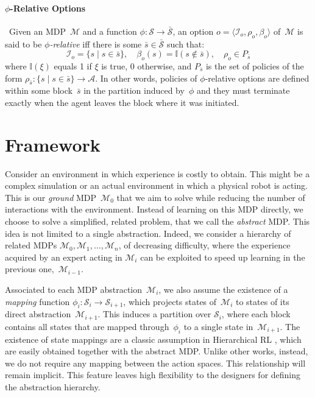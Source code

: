 \documentclass[letterpaper]{article} %
\theoremstyle{plain}
\theoremstyle{definition}
\theoremstyle{remark}
\newcommand{\Indicator}{\mathbb{I}}
\newcommand{\SetSym}[1]{\mathcal{#1}}
\newcommand{\Policy}{\rho}
\newcommand{\PolicySpace}{P}  %
\newcommand{\States}{\SetSym{S}}
\newcommand{\Actions}{\SetSym{A}}
\newcommand{\Model}{\SetSym{M}}
\newcommand{\Mapping}{\phi}
\newcommand{\Abst}[1]{\bar{#1}}
\begin{document}
\paragraph{$\Mapping$-Relative Options}
\cite{abel_2020_ValuePreserving}\, Given an MDP~$\Model$ and a function $\Mapping:
\States \to \Abst\States$, an option $o = \langle \SetSym{I}_o, \Policy_o, \beta_o
\rangle$ of~$\Model$ is said to be \emph{$\Mapping$-relative} iff there is
some $\Abst{s} \in \Abst{\States}$ such that:
\begin{equation}
	\SetSym{I}_o = \{s \mid s \in \Abst{s}\},\quad
	\beta_o(s) = \Indicator(s \not\in \Abst{s}),\quad
	\Policy_o \in \PolicySpace_{\Abst{s}}
\end{equation}
where $\Indicator(\xi)$ equals 1 if $\xi$ is true, $0$ otherwise, and
$\PolicySpace_{\Abst{s}}$ is the set of policies of the form
$\Policy_{\Abst{s}}: \{ s \mid s \in \Abst{s} \} \to \Actions$.
In other words, policies of $\Mapping$-relative options are defined within some block~$\Abst{s}$ in the partition induced by~$\Mapping$
and they must terminate exactly when the agent leaves the block where it was initiated.


\section{Framework}

Consider an environment in which experience is costly to obtain.
This might be a complex simulation or an actual environment in which a physical robot is acting.
This is our \emph{ground} MDP~$\Model_0$ that we aim to solve while reducing the number of interactions with the environment.
Instead of learning on this MDP directly, we choose to solve a simplified, related problem, that we call the \emph{abstract} MDP.
This idea is not limited to a single abstraction.
Indeed, we consider a hierarchy of related MDPs $\Model_0, \Model_1, \dots, \Model_n$, of decreasing difficulty, where the experience acquired by an expert acting in $\Model_i$ can be exploited to speed up learning in the previous one,~$\Model_{i-1}$.

Associated to each MDP abstraction~$\Model_i$, we also assume the existence of a \emph{mapping} function ${\Mapping_i: \States_i \to \States_{i+1}}$, which projects states of~$\Model_i$ to states of its direct abstraction~$\Model_{i+1}$.
This induces a partition over $\States_i$, where each block contains
all states that are mapped through~$\Mapping_{i}$ to a single state in~$\Model_{i+1}$.
The existence of state mappings are a classic assumption in Hierarchical RL
\cite{ravindran_model_2002,abel_2016_OptimalBehavior,abel_2020_ValuePreserving},
which are easily obtained together with the abstract MDP.
Unlike other works, instead, we do not require any mapping between the action spaces.
This relationship will remain implicit.
This feature leaves high flexibility to the designers for defining the abstraction hierarchy.
\end{document}
